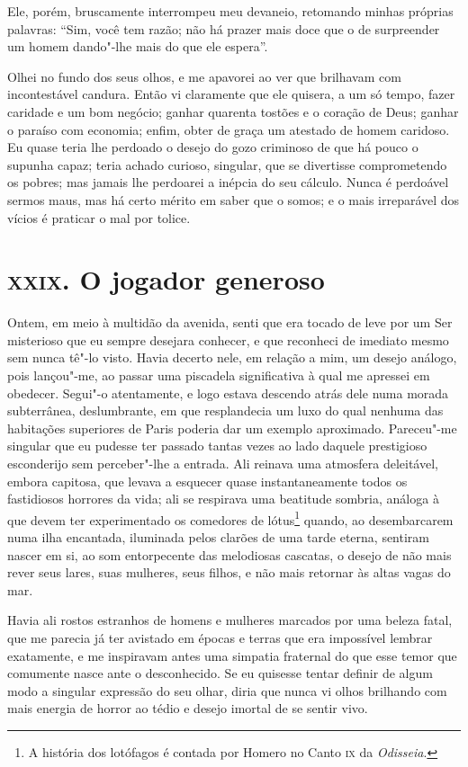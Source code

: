 Ele, porém, bruscamente interrompeu meu devaneio, retomando minhas
próprias palavras: “Sim, você tem razão; não há prazer
mais doce que o de surpreender um homem dando"-lhe mais do que ele
espera''.

Olhei no fundo dos seus olhos, e me apavorei ao ver que
brilhavam com incontestável candura. Então vi claramente que ele
quisera, a um só tempo, fazer caridade e um bom negócio; ganhar quarenta
tostões e o coração de Deus; ganhar o paraíso com economia; enfim,
obter de graça um atestado de homem caridoso. Eu quase teria lhe
perdoado o desejo do gozo criminoso de que há pouco o supunha capaz;
teria achado curioso, singular, que se divertisse comprometendo
os pobres; mas jamais lhe perdoarei a inépcia do seu cálculo. Nunca é
perdoável sermos maus, mas há certo mérito em  saber que o somos; e o
mais irreparável dos vícios é praticar o mal por tolice.

\chapter{\textsc{xxix.} O jogador generoso}

Ontem, em meio à multidão da avenida, senti que era tocado de leve por
um Ser misterioso que eu sempre desejara conhecer, e que reconheci de
imediato mesmo sem nunca tê"-lo visto. Havia decerto nele, em
relação a mim, um desejo análogo, pois lançou"-me, ao passar uma
piscadela significativa à qual me apressei em obedecer. Segui"-o
atentamente, e logo estava descendo atrás dele numa morada subterrânea,
deslumbrante, em que resplandecia um luxo do qual nenhuma das
habitações superiores de Paris poderia dar um exemplo aproximado.
Pareceu"-me singular que eu pudesse ter passado tantas vezes ao lado
daquele prestigioso esconderijo sem perceber"-lhe a entrada. Ali
reinava uma atmosfera deleitável, embora capitosa, que levava a
esquecer quase instantaneamente todos os fastidiosos horrores da
vida; ali se respirava uma beatitude sombria, análoga à que devem ter
experimentado os comedores de lótus\footnote{  A história 
dos lotófagos é contada por Homero no Canto \textsc{ix} da
\textit{Odisseia}.} quando, ao
desembarcarem numa ilha encantada, iluminada pelos clarões de uma tarde
eterna, sentiram nascer em si, ao som entorpecente das melodiosas
cascatas, o desejo de não mais rever seus lares, suas mulheres, seus
filhos, e não mais retornar às altas vagas do mar.

Havia ali rostos estranhos de homens e mulheres marcados por uma beleza
fatal, que me parecia já ter avistado em épocas e terras que era
impossível lembrar exatamente, e me inspiravam antes uma simpatia
fraternal do que esse temor que comumente nasce ante o
desconhecido. Se eu quisesse tentar definir de algum modo a
singular expressão do seu olhar, diria que nunca vi olhos
brilhando com mais energia de horror ao tédio e desejo imortal de
se sentir vivo.

